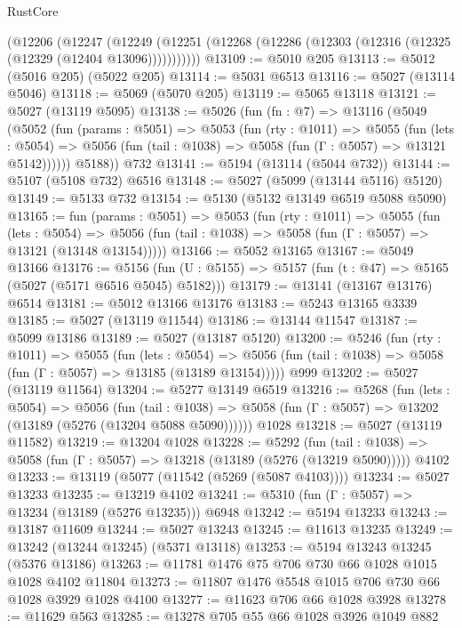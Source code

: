 \begin{lexlean}{RustCore}
\begin{coremodule}
    (@12206
      (@12247
        (@12249 (@12251 (@12268 (@12286 (@12303 (@12316 (@12325 (@12329 (@12404 @13096)))))))))))
@13109 := @5010 @205
@13113 := @5012 (@5016 @205) (@5022 @205)
@13114 := @5031 @6513
@13116 := @5027 (@13114 @5046)
@13118 := @5069 (@5070 @205)
@13119 := @5065 @13118
@13121 := @5027 (@13119 @5095)
@13138 := @5026
    (fun (fn : @7) =>
    @13116
      (@5049
        (@5052
          (fun (params : @5051) =>
          @5053
            (fun (rty : @1011) =>
            @5055
              (fun (lets : @5054) =>
              @5056 (fun (tail : @1038) => @5058 (fun (Γ : @5057) => @13121 @5142))))))
        @5188))
    @732
@13141 := @5194 (@13114 (@5044 @732))
@13144 := @5107 (@5108 @732) @6516
@13148 := @5027 (@5099 (@13144 @5116) @5120)
@13149 := @5133 @732
@13154 := @5130 (@5132 @13149 @6519 @5088 @5090)
@13165 := fun (params : @5051) =>
  @5053
    (fun (rty : @1011) =>
    @5055
      (fun (lets : @5054) =>
      @5056 (fun (tail : @1038) => @5058 (fun (Γ : @5057) => @13121 (@13148 @13154)))))
@13166 := @5052 @13165
@13167 := @5049 @13166
@13176 := @5156
    (fun (U : @5155) => @5157 (fun (t : @47) => @5165 (@5027 (@5171 @6516 @5045) @5182)))
@13179 := @13141 (@13167 @13176) @6514
@13181 := @5012 @13166 @13176
@13183 := @5243 @13165 @3339
@13185 := @5027 (@13119 @11544)
@13186 := @13144 @11547
@13187 := @5099 @13186
@13189 := @5027 (@13187 @5120)
@13200 := @5246
    (fun (rty : @1011) =>
    @5055
      (fun (lets : @5054) =>
      @5056 (fun (tail : @1038) => @5058 (fun (Γ : @5057) => @13185 (@13189 @13154)))))
    @999
@13202 := @5027 (@13119 @11564)
@13204 := @5277 @13149 @6519
@13216 := @5268
    (fun (lets : @5054) =>
    @5056
      (fun (tail : @1038) =>
      @5058 (fun (Γ : @5057) => @13202 (@13189 (@5276 (@13204 @5088 @5090))))))
    @1028
@13218 := @5027 (@13119 @11582)
@13219 := @13204 @1028
@13228 := @5292
    (fun (tail : @1038) => @5058 (fun (Γ : @5057) => @13218 (@13189 (@5276 (@13219 @5090)))))
    @4102
@13233 := @13119 (@5077 (@11542 (@5269 (@5087 @4103))))
@13234 := @5027 @13233
@13235 := @13219 @4102
@13241 := @5310 (fun (Γ : @5057) => @13234 (@13189 (@5276 @13235))) @6948
@13242 := @5194 @13233
@13243 := @13187 @11609
@13244 := @5027 @13243
@13245 := @11613 @13235
@13249 := @13242 (@13244 @13245) (@5371 @13118)
@13253 := @5194 @13243 @13245 (@5376 @13186)
@13263 := @11781 @1476 @75 @706 @730 @66 @1028 @1015 @1028 @4102 @11804
@13273 := @11807 @1476 @5548 @1015 @706 @730 @66 @1028 @3929 @1028 @4100
@13277 := @11623 @706 @66 @1028 @3928
@13278 := @11629 @563
@13285 := @13278 @705 @55 @66 @1028 @3926 @1049 @882

\end{coremodule}
\end{lexlean}
